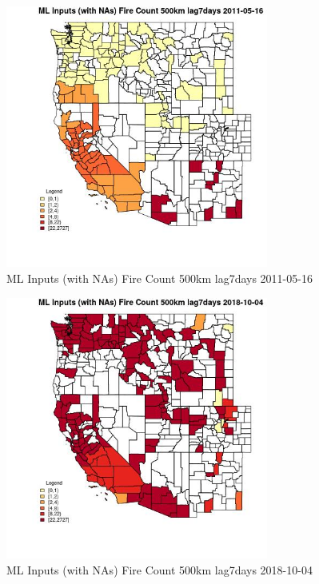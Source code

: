 \begin{figure} 
\centering  
\includegraphics[width=0.77\textwidth]{Code_Outputs/Report_ML_input_PM25_Step4_part_f_de_duplicated_aveswNAs_CountyFire_Count_500km_lag7daysMean2011-05-16.jpg} 
\caption{\label{fig:Report_ML_input_PM25_Step4_part_f_de_duplicated_aveswNAsCountyFire_Count_500km_lag7daysMean2011-05-16}ML Inputs (with NAs) Fire Count 500km lag7days 2011-05-16} 
\end{figure} 
 

\clearpage 

\begin{figure} 
\centering  
\includegraphics[width=0.77\textwidth]{Code_Outputs/Report_ML_input_PM25_Step4_part_f_de_duplicated_aveswNAs_CountyFire_Count_500km_lag7daysMean2018-10-04.jpg} 
\caption{\label{fig:Report_ML_input_PM25_Step4_part_f_de_duplicated_aveswNAsCountyFire_Count_500km_lag7daysMean2018-10-04}ML Inputs (with NAs) Fire Count 500km lag7days 2018-10-04} 
\end{figure} 
 

